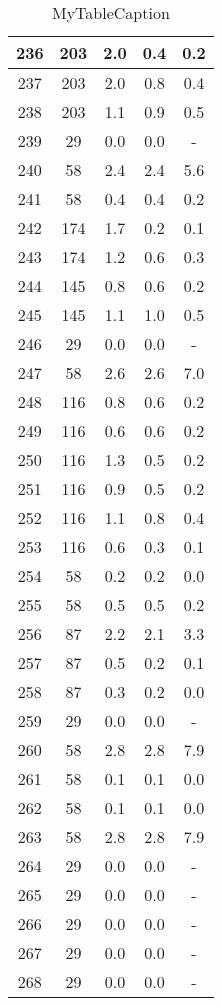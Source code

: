 \documentclass[a4paper,10pt]{article}
\begin{document}
\begin{table}
\begin{tabular}{|c|c|c|c|c|}
\hline
236 & 203 & 2.0 & 0.4 & 0.2 \\
\hline
237 & 203 & 2.0 & 0.8 & 0.4 \\
\hline
238 & 203 & 1.1 & 0.9 & 0.5 \\
\hline
239 & 29 & 0.0 & 0.0 & - \\
\hline
240 & 58 & 2.4 & 2.4 & 5.6 \\
\hline
241 & 58 & 0.4 & 0.4 & 0.2 \\
\hline
242 & 174 & 1.7 & 0.2 & 0.1 \\
\hline
243 & 174 & 1.2 & 0.6 & 0.3 \\
\hline
244 & 145 & 0.8 & 0.6 & 0.2 \\
\hline
245 & 145 & 1.1 & 1.0 & 0.5 \\
\hline
246 & 29 & 0.0 & 0.0 & - \\
\hline
247 & 58 & 2.6 & 2.6 & 7.0 \\
\hline
248 & 116 & 0.8 & 0.6 & 0.2 \\
\hline
249 & 116 & 0.6 & 0.6 & 0.2 \\
\hline
250 & 116 & 1.3 & 0.5 & 0.2 \\
\hline
251 & 116 & 0.9 & 0.5 & 0.2 \\
\hline
252 & 116 & 1.1 & 0.8 & 0.4 \\
\hline
253 & 116 & 0.6 & 0.3 & 0.1 \\
\hline
254 & 58 & 0.2 & 0.2 & 0.0 \\
\hline
255 & 58 & 0.5 & 0.5 & 0.2 \\
\hline
256 & 87 & 2.2 & 2.1 & 3.3 \\
\hline
257 & 87 & 0.5 & 0.2 & 0.1 \\
\hline
258 & 87 & 0.3 & 0.2 & 0.0 \\
\hline
259 & 29 & 0.0 & 0.0 & - \\
\hline
260 & 58 & 2.8 & 2.8 & 7.9 \\
\hline
261 & 58 & 0.1 & 0.1 & 0.0 \\
\hline
262 & 58 & 0.1 & 0.1 & 0.0 \\
\hline
263 & 58 & 2.8 & 2.8 & 7.9 \\
\hline
264 & 29 & 0.0 & 0.0 & - \\
\hline
265 & 29 & 0.0 & 0.0 & - \\
\hline
266 & 29 & 0.0 & 0.0 & - \\
\hline
267 & 29 & 0.0 & 0.0 & - \\
\hline
268 & 29 & 0.0 & 0.0 & - \\
\hline
\end{tabular}
\caption{MyTableCaption}
\label{table:MyTableLabel}
\end{table}
\end{document}
